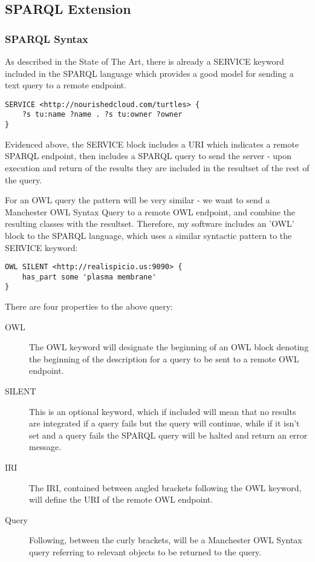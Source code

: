 \documentclass{article}
\begin{document}
\subsection{SPARQL Extension}

\subsubsection{SPARQL Syntax}

As described in the State of The Art, there is already a SERVICE keyword
included in the SPARQL language which provides a good model for sending a text
query to a remote endpoint. 

\begin{lstlisting}
SERVICE <http://nourishedcloud.com/turtles> { 
    ?s tu:name ?name . ?s tu:owner ?owner
}
\end{lstlisting}

Evidenced above, the SERVICE block includes a URI which indicates a remote
SPARQL endpoint, then includes a SPARQL query to send the server - upon
execution and return of the results they are included in the resultset of the
rest of the query.

For an OWL query the pattern will be very similar - we want to send a Manchester
OWL Syntax Query to a remote OWL endpoint, and combine the resulting classes
with the resultset. Therefore, my software includes an 'OWL' block to the SPARQL 
language, which uses a similar syntactic pattern to the SERVICE keyword:

\begin{lstlisting}
OWL SILENT <http://realispicio.us:9090> {
    has_part some 'plasma membrane'
}
\end{lstlisting}

There are four properties to the above query:

\begin{description}
    \item[OWL] The OWL keyword will designate the beginning of an OWL block
    denoting the beginning of the description for a query to be sent to a remote
    OWL endpoint.
    \item[SILENT] This is an optional keyword, which if included will mean that
    no results are integrated if a query fails but the query will continue,
    while if it isn't set and a query fails the SPARQL query will be halted and
    return an error message.
    \item[IRI] The IRI, contained between angled brackets following the OWL
    keyword, will define the URI of the remote OWL endpoint.
    \item[Query] Following, between the curly brackets, will be a Manchester OWL
    Syntax query referring to relevant objects to be returned to the query.
\end{description}
\end{document}
